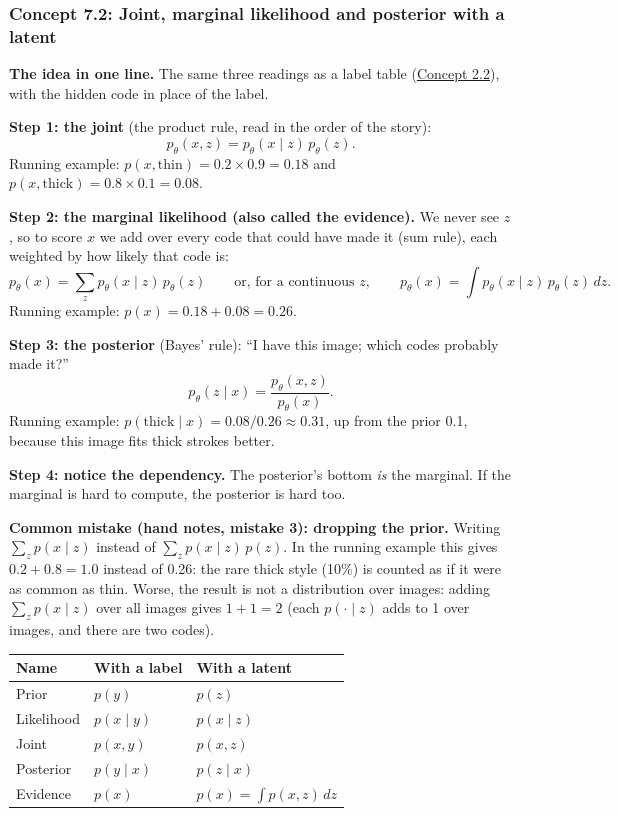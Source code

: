 \documentclass[12pt,a4paper]{article}
\begin{document}
\subsubsection{Concept 7.2: Joint, marginal likelihood and posterior with a latent}\label{c7-2}

\textbf{The idea in one line.} The same three readings as a label table (\hyperref[c2-2]{Concept 2.2}), with the hidden code in place of the label.

\textbf{Step 1: the joint} (the product rule, read in the order of the story):
\[
p_\theta(x,z)=p_\theta(x\mid z)\,p_\theta(z).
\]
Running example: $p(x,\text{thin})=0.2\times0.9=0.18$ and $p(x,\text{thick})=0.8\times0.1=0.08$.

\textbf{Step 2: the marginal likelihood (also called the evidence).} We never see $z$, so to score $x$ we add over every code that could have made it (sum rule), each weighted by how likely that code is:
\[
p_\theta(x)=\sum_z p_\theta(x\mid z)\,p_\theta(z)\qquad\text{or, for a continuous }z,\qquad p_\theta(x)=\int p_\theta(x\mid z)\,p_\theta(z)\,dz .
\]
Running example: $p(x)=0.18+0.08=0.26$.

\textbf{Step 3: the posterior} (Bayes' rule): ``I have this image; which codes probably made it?''
\[
p_\theta(z\mid x)=\frac{p_\theta(x,z)}{p_\theta(x)} .
\]
Running example: $p(\text{thick}\mid x)=0.08/0.26\approx0.31$, up from the prior 0.1, because this image fits thick strokes better.

\textbf{Step 4: notice the dependency.} The posterior's bottom \emph{is} the marginal. If the marginal is hard to compute, the posterior is hard too.

\textbf{Common mistake (hand notes, mistake 3): dropping the prior.} Writing $\sum_z p(x\mid z)$ instead of $\sum_z p(x\mid z)\,p(z)$. In the running example this gives $0.2+0.8=1.0$ instead of 0.26: the rare thick style (10\%) is counted as if it were as common as thin. Worse, the result is not a distribution over images: adding $\sum_z p(x\mid z)$ over all images gives $1+1=2$ (each $p(\cdot\mid z)$ adds to 1 over images, and there are two codes).

\begin{center}
\begin{tabular}{@{}lll@{}}
\toprule
Name & With a label & With a latent \\
\midrule
Prior & $p(y)$ & $p(z)$ \\
Likelihood & $p(x\mid y)$ & $p(x\mid z)$ \\
Joint & $p(x,y)$ & $p(x,z)$ \\
Posterior & $p(y\mid x)$ & $p(z\mid x)$ \\
Evidence & $p(x)$ & $p(x)=\int p(x,z)\,dz$ \\
\bottomrule
\end{tabular}
\end{center}
\end{document}
